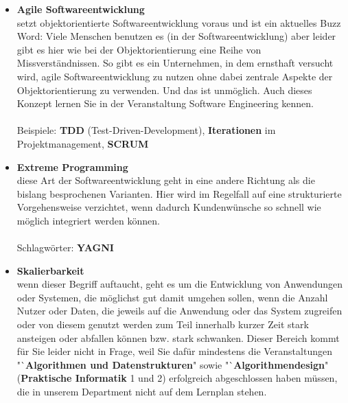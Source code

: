 \begin{itemize}
	\item \textbf{Agile Softwareentwicklung}\\
	setzt objektorientierte Softwareentwicklung voraus und ist ein aktuelles Buzz Word: Viele Menschen benutzen es (in der Softwareentwicklung) aber leider gibt es hier wie bei der Objektorientierung eine Reihe von Missverständnissen. So gibt es ein Unternehmen, in dem ernsthaft versucht wird, agile Softwareentwicklung zu nutzen ohne dabei zentrale Aspekte der Objektorientierung zu verwenden. Und das ist unmöglich. Auch dieses Konzept lernen Sie in der Veranstaltung Software Engineering kennen.\\
	\\
	Beispiele: \textbf{TDD} (Test-Driven-Development), \textbf{Iterationen} im Projektmanagement, \textbf{SCRUM}

	\item \textbf{Extreme Programming}\\
	diese Art der Softwareentwicklung geht in eine andere Richtung als die bislang besprochenen Varianten. Hier wird im Regelfall auf eine strukturierte Vorgehensweise verzichtet, wenn dadurch Kunden\-wünsche so schnell wie möglich integriert werden können.\\
	\\
	Schlagwörter: \textbf{YAGNI}
	
	\item \textbf{Skalierbarkeit} \\
	wenn dieser Begriff auftaucht, geht es um die Entwicklung von Anwendungen oder Systemen, die möglichst gut damit umgehen sollen, wenn die Anzahl Nutzer oder Daten, die jeweils auf die Anwendung oder das System zugreifen oder von diesem genutzt werden zum Teil innerhalb kurzer Zeit stark ansteigen oder abfallen können bzw.  stark schwanken. Dieser Bereich kommt für Sie leider nicht in Frage, weil Sie dafür mindestens die Veranstaltungen "`\textbf{Algorithmen und Datenstrukturen}" sowie "`\textbf{Algorithmendesign}" (\textbf{Praktische Informatik} 1 und 2) erfolgreich abgeschlossen haben müssen, die in unserem Department nicht auf dem Lernplan stehen.
	
\end{itemize}

